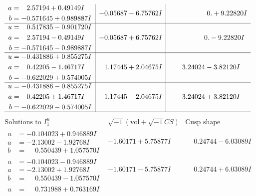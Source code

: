 \documentclass[1p]{elsarticle_modified}
\theoremstyle{definition}
\newcommand{\I}{\sqrt{-1}}
\begin{document}
$$\begin{array}{c|c|c}
\begin{aligned}
a &= \phantom{-}2.57194 + 0.49149 I \\
b &= -0.571645 + 0.989887 I\end{aligned}
 & -0.05687 - 6.75762 I & \phantom{-0.000000 -}0. + 9.22820 I \\ \hline\begin{aligned}
u &= \phantom{-}0.517835 - 0.901720 I \\
a &= \phantom{-}2.57194 - 0.49149 I \\
b &= -0.571645 - 0.989887 I\end{aligned}
 & -0.05687 + 6.75762 I & \phantom{-0.000000 } 0. - 9.22820 I \\ \hline\begin{aligned}
u &= -0.431886 + 0.855275 I \\
a &= \phantom{-}0.42205 - 1.46717 I \\
b &= -0.622029 + 0.574005 I\end{aligned}
 & \phantom{-}1.17445 + 2.04675 I & \phantom{-}3.24024 - 3.82120 I \\ \hline\begin{aligned}
u &= -0.431886 - 0.855275 I \\
a &= \phantom{-}0.42205 + 1.46717 I \\
b &= -0.622029 - 0.574005 I\end{aligned}
 & \phantom{-}1.17445 - 2.04675 I & \phantom{-}3.24024 + 3.82120 I\\
 \hline 
 \end{array}$$\newpage$$\begin{array}{c|c|c}  
\text{Solutions to }I^u_{1}& \I (\text{vol} + \sqrt{-1}CS) & \text{Cusp shape}\\
 \hline 
\begin{aligned}
u &= -0.104023 + 0.946889 I \\
a &= -2.13002 - 1.92768 I \\
b &= \phantom{-}0.550439 + 1.057570 I\end{aligned}
 & -1.60171 + 5.75877 I & \phantom{-}0.24744 - 6.03089 I \\ \hline\begin{aligned}
u &= -0.104023 - 0.946889 I \\
a &= -2.13002 + 1.92768 I \\
b &= \phantom{-}0.550439 - 1.057570 I\end{aligned}
 & -1.60171 - 5.75877 I & \phantom{-}0.24744 + 6.03089 I \\ \hline\begin{aligned}
u &= \phantom{-}0.731988 + 0.763169 I \\

\end{aligned}
\end{array}$$
\end{document}
